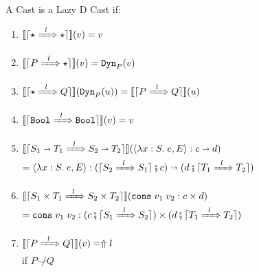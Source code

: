 \documentclass[runningheads]{llncs}
\newcommand{\error}[1]{\ensuremath{\Uparrow#1}}
\newcommand{\Tdyn}[0]{\ensuremath{\star}}
\newcommand{\Pbool}[0]{\ensuremath{\mathtt{Bool}}}
\newcommand{\Pfunc}[2]{\ensuremath{#1 \shortrightarrow #2}}
\newcommand{\Pprod}[2]{\ensuremath{#1 \times #2}}
\newcommand{\elam}[3]{\lambda#1:#2.\;#3}
\newcommand{\econs}[2]{\mathtt{cons} \; #1 \; #2}
\newcommand{\ecast}[2]{\ensuremath{#1 : #2}}
\newcommand{\ccast}[3]{#1 \xRightarrow[]{\enskip #2 \enskip} #3}
\newcommand{\vdyn}[2]{\mathtt{Dyn}_{#1}(#2)}
\newcommand{\vfunc}[4]{\langle\elam{#1}{#2}{#3},#4\rangle}
\newcommand{\vcons}[2]{\econs{#1}{#2}}
\newcommand{\denote}[1]{\ensuremath{\llbracket #1 \rrbracket}}
\newcommand{\compose}[2]{\ensuremath{#1 \fatsemi #2}}
\newcommand{\translate}[1]{\ensuremath{\lceil#1\rceil}}
\newcommand{\notshallowlyconsistent}[2]{\ensuremath{#1\not\smile#2}}
\begin{document}
\begin{definition}
	\label{def:LazyD-CastADT}
	A Cast is a Lazy D Cast if:
	\begin{enumerate}
		\item $\denote{\translate{\ccast{\Tdyn}{l}{\Tdyn}}}(v) = v$
		\item $\denote{\translate{\ccast{P}{l}{\Tdyn}}}(v) = \vdyn{P}{v}$
		\item $\denote{\translate{\ccast{\Tdyn}{l}{Q}}}(\vdyn{P}{u}) = 
		\denote{\translate{\ccast{P}{l}{Q}}}(u)$
		\item $\denote{\translate{\ccast{\Pbool}{l}{\Pbool}}}(v) = v$
		\item 
		$\denote{\translate{\ccast{\Pfunc{S_1}{T_1}}{l}{\Pfunc{S_2}{T_2}}}}(
			\ecast{\vfunc{x}{S}{e}{E}}{\Pfunc{c}{d}})$\\
		$=
		\ecast{\vfunc{x}{S}{e}{E}}{
			\Pfunc{
				(\compose{\translate{\ccast{S_2}{l}{S_1}}}{c})}{
				(\compose{d}{\translate{\ccast{T_1}{l}{T_2}}})}}$
		\item 
		$\denote{\translate{\ccast{\Pprod{S_1}{T_1}}{l}{\Pprod{S_2}{T_2}}}}(
		\ecast{\vcons{v_1}{v_2}}{\Pprod{c}{d}})$\\
		$=
		\ecast{\vcons{v_1}{v_2}}{
			\Pprod{
				(\compose{c}{\translate{\ccast{S_1}{l}{S_2}}})}{
				(\compose{d}{\translate{\ccast{T_1}{l}{T_2}}})}}$
		\item $\denote{\translate{\ccast{P}{l}{Q}}}(v) = \error{l}$\\
			if $\notshallowlyconsistent{P}{Q}$
	\end{enumerate}
\end{definition}
\end{document}
